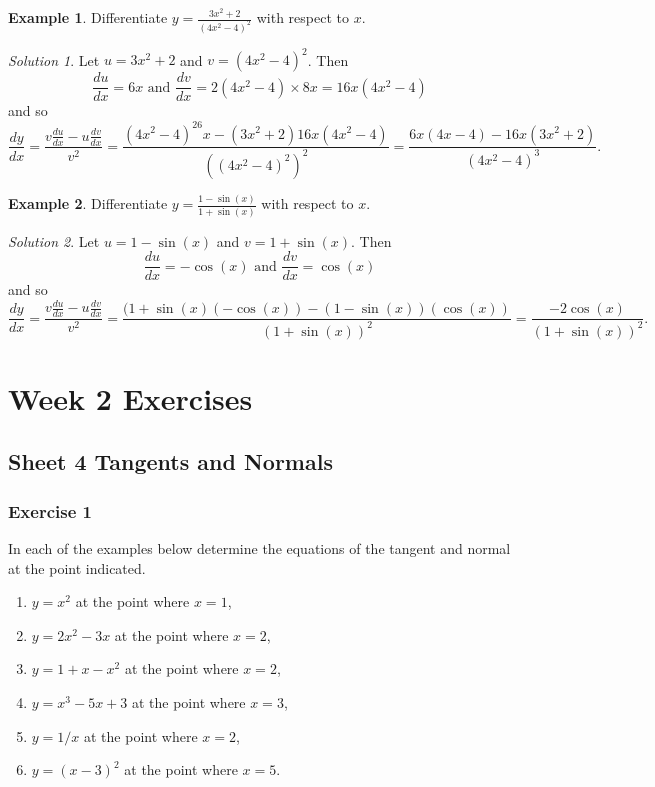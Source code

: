 \documentclass[
  11pt,
  oneside]{book}
\providecommand{\tightlist}{%
  \setlength{\itemsep}{0pt}\setlength{\parskip}{0pt}}
\theoremstyle{definition}
\theoremstyle{definition}
\newtheorem{example}{Example}[chapter]
\theoremstyle{definition}
\theoremstyle{definition}
\theoremstyle{remark}
\newtheorem*{solution}{Solution}
\begin{document}
\begin{example}
Differentiate \(y=\frac{3x^2+2}{(4x^2-4)^2}\) with respect to \(x\).
\end{example}

\begin{solution}
Let \(u = 3x^2+2\) and \(v = (4x^2-4)^2\).
Then
\[
\frac{du}{dx} = 6x\text{ and }\frac{dv}{dx} = 2(4x^2-4)\times8x = 16x(4x^2-4)
\]
and so
\[
\frac{dy}{dx} = \frac{v\frac{du}{dx}-u\frac{dv}{dx}}{v^2} = \frac{(4x^2-4)^26x - (3x^2+2)16x(4x^2-4)}{((4x^2-4)^2)^2} = \frac{6x(4x-4)-16x(3x^2+2)}{(4x^2-4)^3}.
\]
\end{solution}

\begin{example}
Differentiate \(y=\frac{1-\sin(x)}{1+\sin(x)}\) with respect to \(x\).
\end{example}

\begin{solution}
Let \(u = 1-\sin(x)\) and \(v = 1+\sin(x)\).
Then
\[
\frac{du}{dx} = -\cos(x)\text{ and }\frac{dv}{dx} = \cos(x) 
\]
and so
\[
\frac{dy}{dx} = \frac{v\frac{du}{dx}-u\frac{dv}{dx}}{v^2} = \frac{(1+\sin(x)(-\cos(x))-(1-\sin(x))(\cos(x))}{(1+\sin(x))^2} = \frac{-2\cos(x)}{(1+\sin(x))^2}.
\]
\end{solution}

\chapter*{Week 2 Exercises}\label{week-2-exercises}

\section{Sheet 4 Tangents and Normals}\label{sheet-4-tangents-and-normals}

\subsection*{Exercise 1}\label{exercise-1-1}

In each of the examples below determine the equations of the tangent and normal at the point indicated.

\begin{enumerate}
\def\labelenumi{\alph{enumi}.}
\tightlist
\item
  \(y=x^2\) at the point where \(x=1\),
\item
  \(y=2x^2-3x\) at the point where \(x=2\),
\item
  \(y=1+x-x^2\) at the point where \(x=2\),
\item
  \(y=x^3-5x+3\) at the point where \(x=3\),
\item
  \(y=1/x\) at the point where \(x=2\),
\item
  \(y=(x-3)^2\) at the point where \(x=5\).
\end{enumerate}
\end{document}
